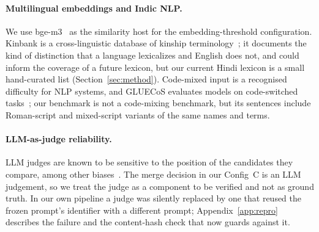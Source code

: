 \paragraph{Multilingual embeddings and Indic NLP.} We use bge-m3~\citep{chen2024bgem3} as the similarity host for the embedding-threshold
configuration. Kinbank is a cross-linguistic database of kinship terminology~\citep{passmore2023kinbank}; it documents the kind of
distinction that a language lexicalizes and English does not, and could inform the coverage of a future lexicon, but our current Hindi
lexicon is a small hand-curated list (Section~\ref{sec:method}). Code-mixed input is a recognised difficulty for NLP systems, and GLUECoS
evaluates models on code-switched tasks~\citep{khanuja2020gluecos}; our benchmark is not a code-mixing benchmark, but its sentences include
Roman-script and mixed-script variants of the same names and terms.

\paragraph{LLM-as-judge reliability.} LLM judges are known to be sensitive to the position of the candidates they compare, among other
biases~\citep{zheng2023judging,wang2023fair}. The merge decision in our Config~C is an LLM judgement, so we treat the judge as a component to
be verified and not as ground truth. In our own pipeline a judge was silently replaced by one that reused the frozen prompt's identifier with
a different prompt; Appendix~\ref{app:repro} describes the failure and the content-hash check that now guards against it.
